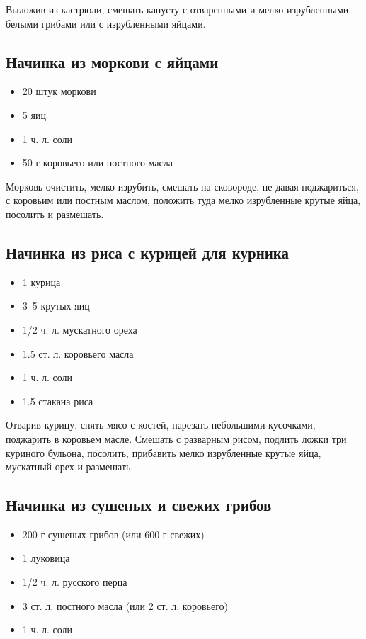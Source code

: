 Выложив из кастрюли, смешать капусту с отваренными и мелко изрубленными белыми грибами или с изрубленными яйцами.

\subsection{Начинка из моркови с яйцами}

\begin{itemize}
	\item 20 штук моркови
    \item 5 яиц 
    \item 1 ч. л. соли 
    \item 50 г коровьего или постного масла
\end{itemize}

Морковь очистить, мелко изрубить, смешать на сковороде, не давая поджариться, с коровьим или постным маслом, положить туда мелко изрубленные крутые яйца, посолить и размешать.

\subsection{Начинка из риса с курицей для курника}

\begin{itemize}
	\item 1 курица
    \item 3–5 крутых яиц 
    \item 1/2 ч. л. мускатного ореха 
    \item 1.5 ст. л. коровьего масла 
    \item 1 ч. л. соли 
    \item 1.5 стакана риса
\end{itemize}

Отварив курицу, снять мясо с костей, нарезать небольшими кусочками, поджарить в коровьем масле. Смешать с разварным рисом, подлить ложки три куриного бульона, посолить, прибавить мелко изрубленные крутые яйца, мускатный орех и размешать.

\subsection{Начинка из сушеных и свежих грибов}

\begin{itemize}
	\item 200 г сушеных грибов (или 600 г свежих) 
    \item 1 луковица 
    \item 1/2 ч. л. русского перца
    \item 3 ст. л. постного масла (или 2 ст. л. коровьего)
    \item 1 ч. л. соли
\end{itemize}

